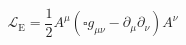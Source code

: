 \begin{equation}
\mathcal{L}_{\text{E}}=\frac{1}{2}A^{\mu }\left( \square g_{\mu \nu
}-\partial _{\mu }\partial _{\nu }\right) A^{\nu }  \label{3}
\end{equation}

